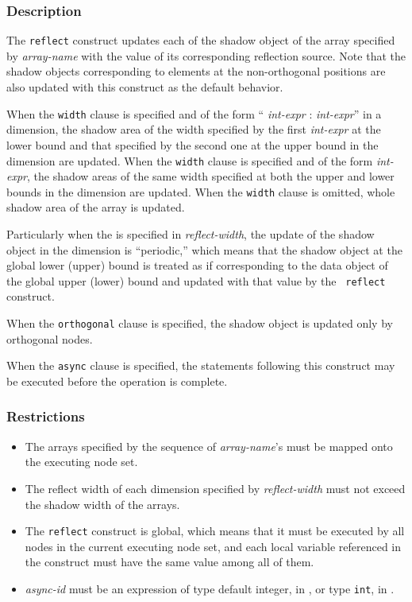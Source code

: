 \subsubsection*{Description}

The {\tt reflect} construct updates each of the shadow object of the
array specified by {\it array-name} with the value of its corresponding
reflection source. Note that the shadow objects corresponding to
elements at the non-orthogonal positions are also updated with this
construct as the default behavior.


When the {\tt width} clause is specified and of the form ``{\it
int-expr} : {\it int-expr}'' in a dimension, the shadow area of the
width specified by the first {\it int-expr} at the lower bound and that
specified by the second one at the upper bound in the dimension are
updated.
%
When the {\tt width} clause is specified and of the form {\it int-expr},
the shadow areas of the same width specified at both the upper
and lower bounds in the dimension are updated.
%
When the {\tt width} clause is omitted, whole shadow area of the array
is updated.

Particularly when the  is specified in
{\it reflect-width}, the update of the shadow object in the dimension is
``periodic,'' which means that the shadow object at the global lower
(upper) bound is treated as if corresponding to the data object of the
global upper (lower) bound and updated with that value by the {\tt
reflect} construct.

When the {\tt orthogonal} clause is specified,
the shadow object is updated only by orthogonal nodes.

When the {\tt async} clause is specified, the statements following this
construct may be executed before the operation is complete.

\subsubsection*{Restrictions}

\begin{itemize}
 \item The arrays specified by the sequence of {\it array-name}'s must
       be mapped onto the executing node set.
 \item The reflect width of each dimension specified by {\it
       reflect-width} must not exceed the shadow width of the arrays.
 \item The {\tt reflect} construct is global, which means that it must be
       executed by all nodes in the current executing node set, and each local
       variable referenced in the construct must have the same value
       among all of them.
 \item {\it async-id} must be an expression of type default integer, in
       {\XMPF}, or type {\tt int}, in {\XMPC}.
\end{itemize}

